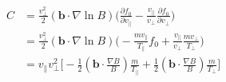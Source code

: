 \begin{equation}
    \begin{split}
        C&=\frac{v_\perp^2}{2}(\bm{b} \cdot \nabla \ln{B}) \Big(\frac{\partial f_0}{\partial v_\parallel} - \frac{v_\parallel}{v_\perp} \frac{\partial f_0}{\partial v_\perp}\Big) \\
        &= \frac{v_\perp^2}{2}(\bm{b} \cdot \nabla \ln{B}) \Big(-\frac{mv_\parallel}{T_\parallel}f_0 + \frac{v_\parallel}{v_\perp} \frac{mv_\perp}{T_\perp}\Big) \\
        &= v_\parallel v_\perp^2 \Big[ -\frac{1}{2}(\bm{b}\cdot \frac{\nabla B}{B})\frac{m}{T_\parallel} + \frac{1}{2}(\bm{b} \cdot \frac{\nabla B}{B}) \frac{m}{T_\perp}\Big]
    \label{FP_C}    
    \end{split}
\end{equation}


